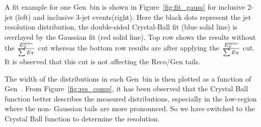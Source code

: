 A fit example for one Gen~\httwo bin is shown in Figure~\ref{fig:fit_gauss} for inclusive 2-jet (left) and inclusive 3-jet events(right).  Here the black dots represent the jet resolution 
distribution, the double-sided Crystal-Ball fit (blue solid line) is overlayed by the Gaussian fit (red solid line). Top 
row shows the results without the $\frac{\ETmiss}{\sum \ET}$ cut whereas the bottom row results are after applying the $\frac{\ETmiss}{\sum 
  \ET}$ cut. It is observed that this cut is not affecting the Reco/Gen tails. %

The width of the distributions in each Gen~\httwo bin is then plotted as a function of Gen~\httwo. From Figure~\ref{fig:res_comp}, it has 
been observed that the Crystal Ball function better describes the measured distributions, especially in the low-\httwo region where the non-
Gaussian tails are more pronounced. So we have switched to the Crystal Ball function to determine the resolution.

